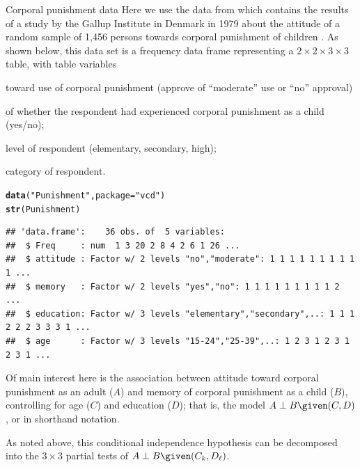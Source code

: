 \documentclass[11pt]{book}\usepackage[]{graphicx}\usepackage[]{color}
\makeatletter
\newcommand{\hlstr}[1]{\textcolor[rgb]{0.192,0.494,0.8}{#1}}%
\newcommand{\hlstd}[1]{\textcolor[rgb]{0.345,0.345,0.345}{#1}}%
\newcommand{\hlkwc}[1]{\textcolor[rgb]{0.333,0.667,0.333}{#1}}%
\newcommand{\hlkwd}[1]{\textcolor[rgb]{0.737,0.353,0.396}{\textbf{#1}}}%
\newenvironment{kframe}{%
 \def\at@end@of@kframe{}%
 \ifinner\ifhmode%
  \def\at@end@of@kframe{\end{minipage}}%
  \begin{minipage}{\columnwidth}%
 \fi\fi%
 \def\FrameCommand##1{\hskip\@totalleftmargin \hskip-\fboxsep
 \colorbox{shadecolor}{##1}\hskip-\fboxsep
     \hskip-\linewidth \hskip-\@totalleftmargin \hskip\columnwidth}%
 \MakeFramed {\advance\hsize-\width
   \@totalleftmargin\z@ \linewidth\hsize
   \@setminipage}}%
 {\par\unskip\endMakeFramed%
 \at@end@of@kframe}
\newenvironment{knitrout}{}{} %
\renewenvironment{knitrout}{\small\renewcommand{\baselinestretch}{.85}}{} %
\makeatother
\begin{document}
\begin{Example}[punish]{Corporal punishment data}
Here we use the  data from 
which contains the results of
a study by the Gallup Institute in Denmark in 1979 about the attitude of a random sample of 1,456 persons towards corporal punishment of children \citep[pp. 207-208]{Andersen:91}.
As shown below, this data set is a frequency data frame representing a
$2 \times 2 \times 3 \times 3$ table, with table variables
\begin{seriate}
 \item {} toward use of corporal punishment (approve of ``moderate'' use or ``no'' approval)
 \item {} of whether the respondent had experienced corporal punishment as a child (yes/no);
 \item {} level of respondent (elementary, secondary, high);
 \item {} category of respondent.
\end{seriate}
\begin{knitrout}\footnotesize
{}\color{fgcolor}\begin{kframe}
\begin{alltt}
\hlkwd{data}\hlstd{(}\hlstr{"Punishment"}\hlstd{,} \hlkwc{package} \hlstd{=} \hlstr{"vcd"}\hlstd{)}
\hlkwd{str}\hlstd{(Punishment)}
\end{alltt}
\begin{verbatim}
## 'data.frame':	36 obs. of  5 variables:
##  $ Freq     : num  1 3 20 2 8 4 2 6 1 26 ...
##  $ attitude : Factor w/ 2 levels "no","moderate": 1 1 1 1 1 1 1 1 1 1 ...
##  $ memory   : Factor w/ 2 levels "yes","no": 1 1 1 1 1 1 1 1 1 2 ...
##  $ education: Factor w/ 3 levels "elementary","secondary",..: 1 1 1 2 2 2 3 3 3 1 ...
##  $ age      : Factor w/ 3 levels "15-24","25-39",..: 1 2 3 1 2 3 1 2 3 1 ...
\end{verbatim}
\end{kframe}
\end{knitrout}

Of main interest here is the association between attitude toward corporal punishment as an adult ($A$)
and memory of corporal punishment as a child ($B$), 
controlling for age ($C$) and education ($D$); that is, the model $A \perp B \given (C,D)$,
or  in shorthand notation.

As noted above, this conditional independence
hypothesis can be decomposed into the $3 \times 3$ partial tests of
$A \perp B \given (C_k,D_\ell)$.


\end{Example}
\end{document}
